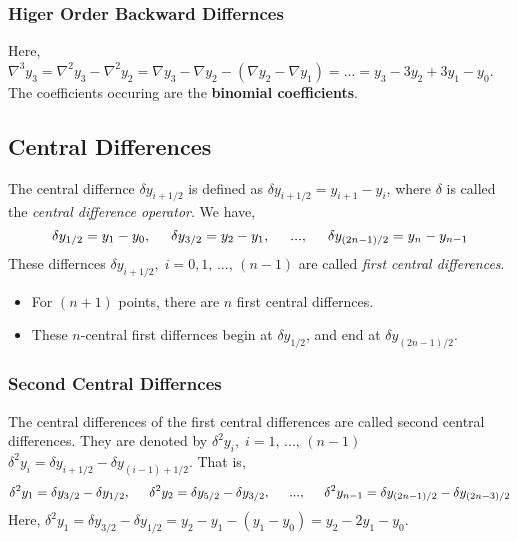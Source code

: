 \documentclass[aima203_lecturenotes_ku.tex]{subfiles}
\begin{document}
\subsubsection{Higer Order Backward Differnces}
Here, $\nabla ^3 y_3 = \nabla ^2 y_3 - \nabla ^2 y_2 = \nabla y_3 - \nabla y_2-(\nabla y_2 - \nabla y_1) = ... = y_3 - 3y_2 + 3y_1- y_0$. \\
The coefficients occuring are the \textbf{binomial coefficients}.

\subsection{Central Differences}
The central differnce $\delta y_{i+1/2}$ is defined as $\delta y_{i+1/2} = y_{i+1} - y_i$, where $\delta$ is called the \textit{central difference operator}. We have,
\begin{equation}
  \label{central}
  \delta y_{1/2} = y_1 - y_0, \hspace{5mm} \delta y_{3/2} = y_2 - y_1, \hspace{5mm} ..., \hspace{5mm} \delta y_{(2n-1)/2} = y_{n} - y_{n-1}
\end{equation}
These differnces $\delta y_{i+1/2}, \; i=0,1,\, ..., \, (n-1)$ are called \textit{first central differences}.
\begin{itemize}
\item For $(n+1)$ points, there are $n$ first central differnces.
\item These $n$-central first differnces begin at $\delta y_{1/2}$, and end at $\delta y_{(2n-1)/2}$.
\end{itemize}

\subsubsection{Second Central Differnces}
The central differences of the first central differences are called second central differences. They are denoted by $\delta ^2 y_{i}, \; i=1,\, ..., \, (n-1)$ $\delta^2 y_{i} = \delta y_{i+1/2} - \delta y_{(i-1) + 1/2}$. That is,
\begin{equation}
  \label{central2}
  \delta ^2 y_1 = \delta y_{3/2} - \delta y_{1/2}, \hspace{5mm} \delta ^2 y_2 = \delta y_{5/2} - \delta y_{3/2}, \hspace{5mm} ..., \hspace{5mm} \delta ^2 y_{n-1} = \delta y_{(2n-1)/2} - \delta y_{(2n-3)/2}
\end{equation}
Here, $\delta ^2 y_1 = \delta y_{3/2} - \delta y_{1/2} = y_2 - y_1 - (y_1 - y_0) = y_2 -2y_1 - y_0$.
\end{document}

